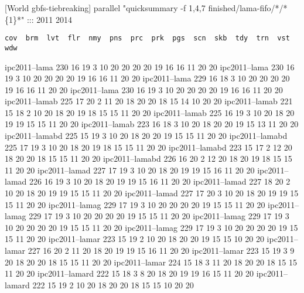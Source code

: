 [World gbfs-tiebreaking] parallel "quicksummary -f 1,4,7 finished/lama-fifo/*/*\{1\}*" ::: 2011 2014
\begin{verbatim}
cov  brm  lvt  flr  nmy  pns  prc  prk  pgs  scn  skb  tdy  trn  vst  wdw
\end{verbatim}
ipc2011--lama     230  16   19   3    10   20   20   20   20   19   16   16   11   20   20
ipc2011--lama     230  16   19   3    10   20   20   20   20   19   16   16   11   20   20
ipc2011--lama     229  16   18   3    10   20   20   20   20   19   16   16   11   20   20
ipc2011--lama     230  16   19   3    10   20   20   20   20   19   16   16   11   20   20
ipc2011--lamab    225  17   20   2    11   20   18   20   20   18   15   14   10   20   20
ipc2011--lamab    221  15   18   2    10   20   18   20   19   18   15   15   11   20   20
ipc2011--lamab    225  16   19   3    10   20   18   20   19   19   15   15   11   20   20
ipc2011--lamab    223  16   18   3    10   20   18   20   20   19   15   13   11   20   20
ipc2011--lamabd   225  15   19   3    10   20   18   20   20   19   15   15   11   20   20
ipc2011--lamabd   225  17   19   3    10   20   18   20   19   18   15   15   11   20   20
ipc2011--lamabd   223  15   17   2    12   20   18   20   20   18   15   15   11   20   20
ipc2011--lamabd   226  16   20   2    12   20   18   20   19   18   15   15   11   20   20
ipc2011--lamad    227  17   19   3    10   20   18   20   19   19   15   16   11   20   20
ipc2011--lamad    226  16   19   3    10   20   18   20   19   19   15   16   11   20   20
ipc2011--lamad    227  18   20   2    10   20   18   20   19   19   15   15   11   20   20
ipc2011--lamad    227  17   20   3    10   20   18   20   19   19   15   15   11   20   20
ipc2011--lamag    229  17   19   3    10   20   20   20   20   19   15   15   11   20   20
ipc2011--lamag    229  17   19   3    10   20   20   20   20   19   15   15   11   20   20
ipc2011--lamag    229  17   19   3    10   20   20   20   20   19   15   15   11   20   20
ipc2011--lamag    229  17   19   3    10   20   20   20   20   19   15   15   11   20   20
ipc2011--lamar    223  15   19   2    10   20   18   20   20   19   15   15   10   20   20
ipc2011--lamar    227  16   20   2    11   20   18   20   19   19   15   16   11   20   20
ipc2011--lamar    223  15   19   3    9    20   18   20   20   18   15   15   11   20   20
ipc2011--lamar    224  15   18   3    11   20   18   20   20   18   15   15   11   20   20
ipc2011--lamard   222  15   18   3    8    20   18   20   19   19   16   15   11   20   20
ipc2011--lamard   222  15   19   2    10   20   18   20   20   18   15   15   10   20   20

